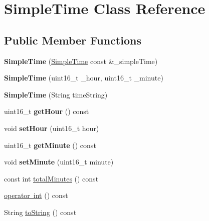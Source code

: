 \hypertarget{class_simple_time}{}\section{Simple\+Time Class Reference}
\label{class_simple_time}
\subsection*{Public Member Functions}
\begin{DoxyCompactItemize}
\item 
\mbox{\label{class_simple_time_abf929f0ba662f85ab42a9d2eb6a98a4d}} 
{\bfseries Simple\+Time} (\mbox{\hyperlink{class_simple_time}{Simple\+Time}} const \&\+\_\+simple\+Time)
\item 
\mbox{\label{class_simple_time_ac9bd49ce2f132b593d3d0d47c9efdb08}} 
{\bfseries Simple\+Time} (uint16\+\_\+t \+\_\+hour, uint16\+\_\+t \+\_\+minute)
\item 
\mbox{\label{class_simple_time_a95825a96f5afb95060a3b36d78ac11e9}} 
{\bfseries Simple\+Time} (String time\+String)
\item 
\mbox{\label{class_simple_time_a386922a41d88aaab69497730b163cadf}} 
uint16\+\_\+t {\bfseries get\+Hour} () const
\item 
\mbox{\label{class_simple_time_aba0375d3ee93859fdb37b15532c149a4}} 
void {\bfseries set\+Hour} (uint16\+\_\+t hour)
\item 
\mbox{\label{class_simple_time_a02c7df278fb87be73998306330198018}} 
uint16\+\_\+t {\bfseries get\+Minute} () const
\item 
\mbox{\label{class_simple_time_ac5b1e04be8f134f378950dcb6f22f966}} 
void {\bfseries set\+Minute} (uint16\+\_\+t minute)
\item 
const int \mbox{\hyperlink{class_simple_time_a9fd5a5025ccd3bd60d4049c5c113ec4c}{total\+Minutes}} () const
\item 
\mbox{\hyperlink{class_simple_time_a9d034d06249024ed0366c99029243168}{operator int}} () const
\item 
String \mbox{\hyperlink{class_simple_time_a9de383bf9aaf23dbba9b13e0b9b4f0ed}{to\+String}} () const
\end{DoxyCompactItemize}
